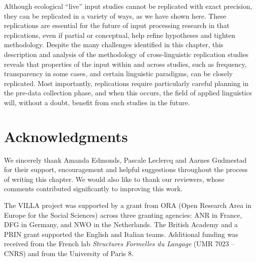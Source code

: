 \documentclass[output=paper,colorlinks,citecolor=brown,modfonts,nonflat]{../langscibook}
\begin{document}
Although ecological “live” input studies cannot be replicated with exact precision, they can be replicated in a variety of ways, as we have shown here. These replications are essential for the future of input processing research in that replications, even if partial or conceptual, help refine hypotheses and tighten methodology. Despite the many challenges identified in this chapter, this description and analysis of the methodology of cross-linguistic replication studies reveals that properties of the input within and across studies, such as frequency, transparency in some cases, and certain linguistic paradigms, can be closely replicated. Most importantly, replications require particularly careful planning in the pre-data collection phase, and when this occurs, the field of applied linguistics will, without a doubt, benefit from such studies in the future.

\section*{Acknowledgments}
We sincerely thank Amanda Edmonds, Pascale Leclercq and Aarnes Gudmestad for their support, encouragement and helpful suggestions throughout the process of writing this chapter. We would also like to thank our reviewers, whose comments contributed significantly to improving this work.

The VILLA project was supported by a grant from ORA (Open Research Area in Europe for the Social Sciences) across three granting agencies: ANR in France, DFG in Germany, and NWO in the Netherlands. The British Academy and a PRIN grant supported the English and Italian teams. Additional funding was received from the French lab \textit{Structures Formelles du Langage} (UMR 7023 – CNRS) and from the University of Paris 8.

{\sloppy\printbibliography[heading=subbibliography,notkeyword=this]}
\end{document}
